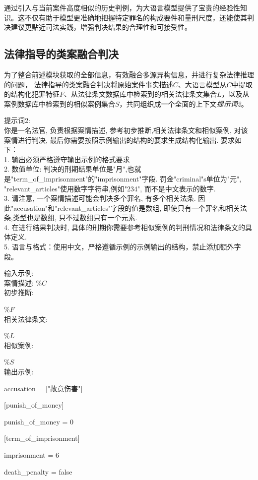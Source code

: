 通过引入与当前案件高度相似的历史判例，为大语言模型提供了宝贵的经验性知识。这不仅有助于模型更准确地把握特定罪名的构成要件和量刑尺度，还能使其判决建议更贴近司法实践，增强判决结果的合理性和可接受性。
\subsection{\heiti 法律指导的类案融合判决}

为了整合前述模块获取的全部信息，有效融合多源异构信息，并进行复杂法律推理的问题， 法律指导的类案融合判决将原始案件事实描述$C$、大语言模型从$C$中提取的结构化犯罪特征$F$、从法律条文数据库中检索到的相关法律条文集合$L$，以及从案例数据库中检索到的相似案例集合$S$，共同组织成一个全面的上下文\textit{提示词2}。

提示词2:
\\
你是一名法官, 负责根据案情描述, 参考初步推断,相关法律条文和相似案例, 对该案情进行判决, 最后你需要按照示例输出的结构的要求生成结构化输出.
要求如下：
\\
1. 输出必须严格遵守输出示例的格式要求
\\
2. 数值单位: 判决的刑期结果单位是"月",也就是"term\_of\_imprisonment"的"imprisonment"字段. 罚金"criminal"s单位为"元", "relevant\_articles"使用数字字符串,例如"234", 而不是中文表示的数字.
\\
3. 请注意, 一个案情描述可能会判决多个罪名, 有多个相关法条. 因此"accusation"和"relevant\_articles"字段的值是数组, 即使只有一个罪名和相关法条,类型也是数组, 只不过数组只有一个元素.
\\
4. 在进行结果判决时, 具体的刑期你需要参考相似案例的判刑情况和法律条文的具体定义.
\\
5. 语言与格式：使用中文，严格遵循示例的示例输出的结构，禁止添加额外字段。

输入示例:
\\
案情描述:
\%$C$
\\
初步推断:

\%$F$
\\
相关法律条文:

\%$L$
\\
相似案例:

\%$S$
\\
输出示例:

accusation = ["故意伤害"]

[punish\_of\_money]

punish\_of\_money = 0

[term\_of\_imprisonment]

imprisonment = 6

death\_penalty = false

